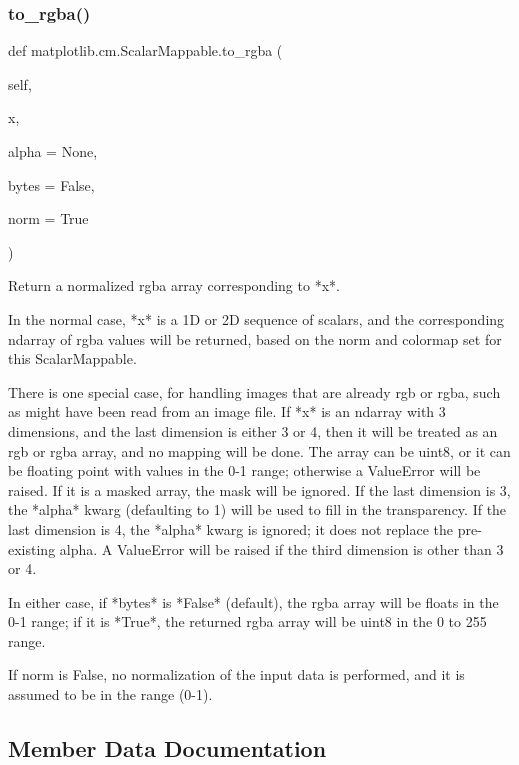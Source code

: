 \subsubsection{\texorpdfstring{to\+\_\+rgba()}{to\_rgba()}}
{\footnotesize\ttfamily def matplotlib.\+cm.\+Scalar\+Mappable.\+to\+\_\+rgba (\begin{DoxyParamCaption}\item[{}]{self,  }\item[{}]{x,  }\item[{}]{alpha = {\ttfamily None},  }\item[{}]{bytes = {\ttfamily False},  }\item[{}]{norm = {\ttfamily True} }\end{DoxyParamCaption})}

\begin{DoxyVerb}Return a normalized rgba array corresponding to *x*.

In the normal case, *x* is a 1D or 2D sequence of scalars, and
the corresponding ndarray of rgba values will be returned,
based on the norm and colormap set for this ScalarMappable.

There is one special case, for handling images that are already
rgb or rgba, such as might have been read from an image file.
If *x* is an ndarray with 3 dimensions,
and the last dimension is either 3 or 4, then it will be
treated as an rgb or rgba array, and no mapping will be done.
The array can be uint8, or it can be floating point with
values in the 0-1 range; otherwise a ValueError will be raised.
If it is a masked array, the mask will be ignored.
If the last dimension is 3, the *alpha* kwarg (defaulting to 1)
will be used to fill in the transparency.  If the last dimension
is 4, the *alpha* kwarg is ignored; it does not
replace the pre-existing alpha.  A ValueError will be raised
if the third dimension is other than 3 or 4.

In either case, if *bytes* is *False* (default), the rgba
array will be floats in the 0-1 range; if it is *True*,
the returned rgba array will be uint8 in the 0 to 255 range.

If norm is False, no normalization of the input data is
performed, and it is assumed to be in the range (0-1).\end{DoxyVerb}
 

\subsection{Member Data Documentation}
\mbox{\label{classmatplotlib_1_1cm_1_1ScalarMappable_a8fd7de7a97ab3d0543d04e7cd5783fdf}} 
